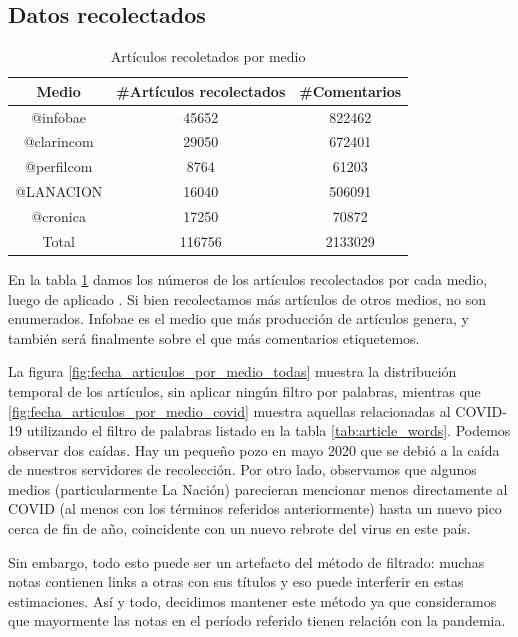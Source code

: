 \subsection{Datos recolectados}

\begin{table}[t]
    \centering
    \begin{tabular}{c|c|c}
    Medio      & \#Artículos recolectados & \#Comentarios \\
    \hline
    @infobae   &  45652   &  822462 \\
    @clarincom &  29050   &  672401 \\
    @perfilcom &  8764    &  61203  \\
    @LANACION  &  16040   &  506091 \\
    @cronica   &  17250   &  70872 \\
    \hline
    Total      & 116756  & 2133029 \\
    \end{tabular}
    \caption{Artículos recoletados por medio}
    \label{tab:articulos_recoletados_por_medio}
\end{table}


En la tabla \ref{tab:articulos_recoletados_por_medio} damos los números de los artículos recolectados por cada medio, luego de aplicado . Si bien recolectamos más artículos de otros medios, no son enumerados. Infobae es el medio que más producción de artículos genera, y también será finalmente sobre el que más comentarios etiquetemos.

La figura \ref{fig:fecha_articulos_por_medio_todas} muestra la distribución temporal de los artículos, sin aplicar ningún filtro por palabras, mientras que \ref{fig:fecha_articulos_por_medio_covid} muestra aquellas relacionadas al COVID-19 utilizando el filtro de palabras listado en la tabla \ref{tab:article_words}. Podemos observar dos caídas. Hay un pequeño pozo en mayo 2020 que se debió a la caída de nuestros servidores de recolección. Por otro lado, observamos que algunos medios (particularmente La Nación) parecieran mencionar menos directamente al COVID (al menos con los términos referidos anteriormente) hasta un nuevo pico cerca de fin de año, coincidente con un nuevo rebrote del virus en este país.

Sin embargo, todo esto puede ser un artefacto del método de filtrado: muchas notas contienen links a otras con sus títulos y eso puede interferir en estas estimaciones. Así y todo, decidimos mantener este método ya que consideramos que mayormente las notas en el período referido tienen relación con la pandemia.

